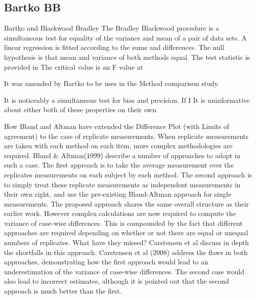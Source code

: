 \subsection*{Bartko BB}
Bartko and Blackwood Bradley
The Bradley Blackwood procedure is a simultaneous test for equality of the variance and mean of a pair of data sets. 
A linear regression is fitted according to the sums and differences.
The null hypothesis is that mean and variance of both methods equal.
The test statistic is provided in 
The critical value is an F value at \alpha %





It was amended by Bartko to be uses in the Method comparison study.

It is noticeably a simultaneous test for bias and precision. If I It is uninformative about either both of these properties on their own.

\newpage
How Bland and Altman have extended the Difference Plot (with Limits of agreement) to the case of replicate measurements.
When replicate measurements are taken with each method on each item, more complex methodologies are required. Bland & Altman(1999) describe a number of approaches to adopt in such a case. The first approach is to take the average measurement over the replicates measurements on each subject by each method.
The second approach is to simply treat these replicate measurements as independent measurements in their own right, and use the pre-existing Bland-Altman approach for single measurements.
The proposed approach shares the same overall structure as their earlier work. However complex calculations are now required to compute the variance of case-wise differences. This is compounded by the fact that different approaches are required depending on whether or not there are equal or unequal numbers of replicates.
What have they missed? Carstensen et al discuss in depth the shortfalls in this approach.
Carstensen et al (2008) address the flaws in both approaches, demonstrating how the first approach would lead to an underestimation of the variance of case-wise differences. The second case would also lead to incorrect estimates, although it is pointed out that the second approach is much better than the first.

